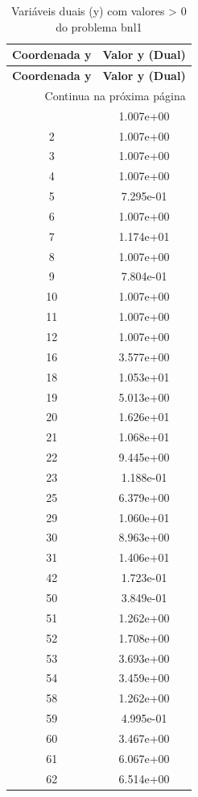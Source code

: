 \documentclass[12pt]{article}
\begin{document}
\begin{longtable}{@{}cc@{}}
\caption{Variáveis duais (y) com valores > 0 do problema bnl1} \\
\toprule
\textbf{Coordenada y} & \textbf{Valor y (Dual)} \\
\midrule
\endfirsthead

\toprule
\textbf{Coordenada y} & \textbf{Valor y (Dual)} \\
\midrule
\endhead

\midrule \multicolumn{2}{r}{{Continua na próxima página}} \\ \midrule
\endfoot

\bottomrule
\endlastfoot
1 & 1.007e+00 \\
2 & 1.007e+00 \\
3 & 1.007e+00 \\
4 & 1.007e+00 \\
5 & 7.295e-01 \\
6 & 1.007e+00 \\
7 & 1.174e+01 \\
8 & 1.007e+00 \\
9 & 7.804e-01 \\
10 & 1.007e+00 \\
11 & 1.007e+00 \\
12 & 1.007e+00 \\
16 & 3.577e+00 \\
18 & 1.053e+01 \\
19 & 5.013e+00 \\
20 & 1.626e+01 \\
21 & 1.068e+01 \\
22 & 9.445e+00 \\
23 & 1.188e-01 \\
25 & 6.379e+00 \\
29 & 1.060e+01 \\
30 & 8.963e+00 \\
31 & 1.406e+01 \\
42 & 1.723e-01 \\
50 & 3.849e-01 \\
51 & 1.262e+00 \\
52 & 1.708e+00 \\
53 & 3.693e+00 \\
54 & 3.459e+00 \\
58 & 1.262e+00 \\
59 & 4.995e-01 \\
60 & 3.467e+00 \\
61 & 6.067e+00 \\
62 & 6.514e+00 \\

\end{longtable}
\end{document}
